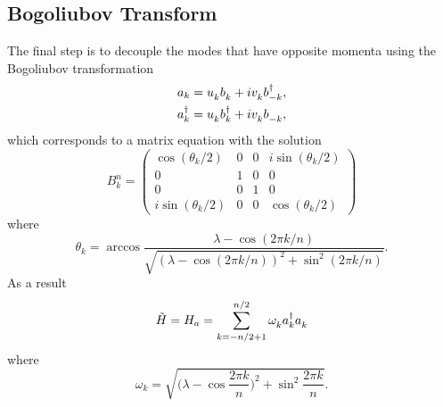 \documentclass[12pt, twocolumn]{article}
\newcommand*{\iu}{i}
\begin{document}
  \subsection{Bogoliubov Transform}
  The final step is to decouple the modes that have opposite momenta using the Bogoliubov transformation
  \begin{subequations}
    \begin{align}
      a_{k}
        &= u_{k}^{\vphantom{\dagger}} b_{k}^{\vphantom{\dagger}}
           + \iu v_{k}^{\vphantom{\dagger}} b_{-k}^{\dagger}, \\
      a_{k}^{\dagger}
        &= u_{k}^{\vphantom{\dagger}} b_{k}^{\dagger}
           + \iu v_{k}^{\vphantom{\dagger}} b_{-k}^{\vphantom{\dagger}},
    \end{align}
  \end{subequations}
  which corresponds to a matrix equation with the solution
  \begin{equation}
    B_{k}^{n}
      = \begin{pmatrix}
              \cos(\theta_{k} / 2) & 0 & 0 & \iu \sin(\theta_{k} / 2) \\
                                 0 & 1 & 0 &                        0 \\
                                 0 & 0 & 1 &                        0 \\
          \iu \sin(\theta_{k} / 2) & 0 & 0 &     \cos(\theta_{k} / 2)
      \end{pmatrix}
  \end{equation}
  where
  \begin{equation}
    \theta_{k}
      = \arccos
        \frac{\lambda - \cos(2 \pi k / n)}
             {\sqrt{(\lambda - \cos(2 \pi k / n))^{2} + \sin^{2}(2 \pi k / n)}}.
  \end{equation}
  As a result
  \begin{equation}
    \tilde{H}
      = H_{a}
      = \sum_{k = -n / 2 + 1}^{n / 2}
        \omega_{k}^{\vphantom{\dagger}} a_{k}^{\dagger}
        a_{k}^{\vphantom{\dagger}}
  \end{equation}
  where
  \begin{equation}
    \omega_{k}
      = \sqrt{\biggl( \lambda - \cos \frac{2\pi k}{n} \biggr)^{2}
              + \sin^{2} \frac{2\pi k}{n}}.
  \end{equation}
\end{document}
